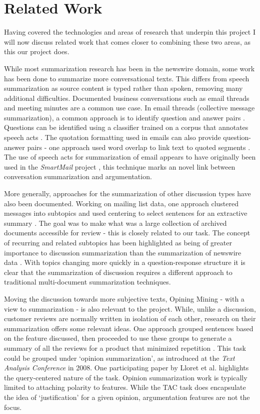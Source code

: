   \section{Related Work}
    Having covered the technologies and areas of research that underpin this project I will now discuss related work that comes closer to combining these two areas, as this our project does.

    While most summarization research has been in the newswire domain, some work has been done to summarize more conversational texts. This differs from speech summarization as source content is typed rather than spoken, removing many additional difficulties. Documented business conversations such as email threads and meeting minutes are a common use case. In email threads (collective message summarization), a common approach is to identify question and answer pairs \cite{shrestha2007using,shrestha2004detection,carenini2007summarizing}. Questions can be identified using a classifier trained on a corpus that annotates speech acts \cite{shrestha2004detection}. The quotation formatting used in emails can also provide question-answer pairs - one approach used word overlap to link text to quoted segments \cite{carenini2007summarizing}. The use of speech acts for summarization of email appears to have originally been used in the \textit{SmartMail} project \cite{corston2004task}, this technique marks an novel link between conversation summarization and argumentation.

    More generally, approaches for the summarization of other discussion types have also been documented. Working on mailing list data, one approach clustered messages into subtopics and used centering to select sentences for an extractive summary \cite{newman2003summarizing}. The goal was to make what was a large collection of archived documents accessible for review - this is closely related to our task. The concept of recurring and related subtopics has been highlighted as being of greater importance to discussion summarization than the summarization of newswire data \cite{zhou2006summarization}. With topics changing more quickly in a question-response structure it is clear that the summarization of discussion requires a different approach to traditional multi-document summarization techniques.

    Moving the discussion towards more subjective texts, Opining Mining - with a view to summarization - is also relevant to the project. While, unlike a discussion, customer reviews are normally written in isolation of each other, research on their summarization offers some relevant ideas. One approach grouped sentences based on the feature discussed, then proceeded to use these groups to generate a summary of all the reviews for a product that minimized repetition \cite{hu2004mining}. This task could be grouped under `opinion summarization', as introduced at the \textit{Text Analysis Conference} in 2008. One participating paper by Lloret et al. \cite{lloret2009towards} highlights the query-centered nature of the task. Opinion summarization work is typically limited to attaching polarity to features. While the TAC task does encapsulate the idea of `justification' for a given opinion, argumentation features are not the focus.

